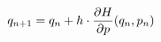 \documentclass[preview]{standalone}
\begin{document}
\begin{align*}
\special{dvisvgm:raw <g id='unique000'>}q_{n+1} &= q_n + h \cdot \frac{\partial H}{\partial p}(q_n, p_n)\special{dvisvgm:raw </g>}
\end{align*}
\end{document}
